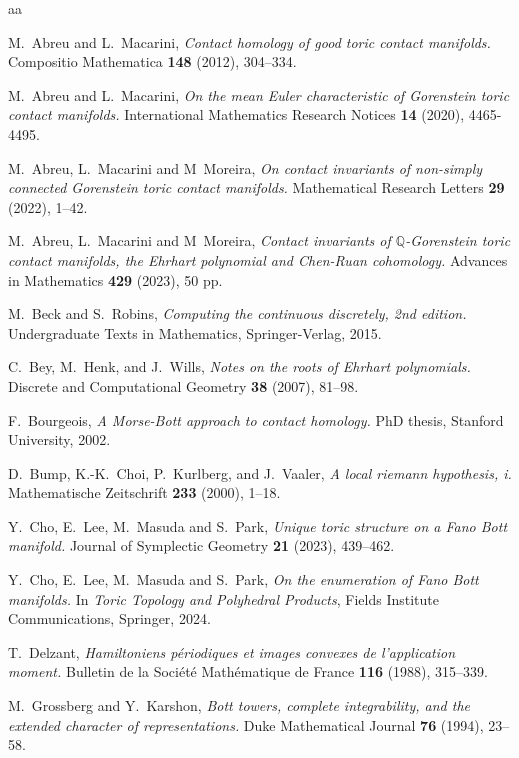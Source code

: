 \documentclass[a4paper,11pt,reqno]{amsart}
\newcommand{\Q}{\mathbb Q}
\begin{document}
\begin{thebibliography}{aa}

 M.~Abreu and L.~Macarini, {\em Contact homology of good toric contact manifolds.}
Compositio Mathematica {\bf 148} (2012), 304--334.

 M.~Abreu and L.~Macarini, {\em On the mean Euler characteristic of Gorenstein toric contact manifolds.}
International Mathematics Research Notices {\bf 14} (2020), 4465-4495.

 M.~Abreu, L.~Macarini and M~Moreira, {\em On contact invariants of non-simply connected Gorenstein 
toric contact manifolds.} Mathematical Research Letters {\bf 29} (2022), 1--42.

 M.~Abreu, L.~Macarini and M~Moreira, {\em Contact invariants of $\Q$-Gorenstein toric contact manifolds, the Ehrhart polynomial and Chen-Ruan cohomology.} Advances in Mathematics {\bf 429} (2023), 50 pp.

 M.~Beck and S.~Robins, {\em Computing the continuous discretely, 2nd edition.} Undergraduate Texts in Mathematics, 
Springer-Verlag, 2015.

 C.~Bey, M.~Henk, and J.~Wills, {\em Notes on the roots of Ehrhart polynomials.} 
Discrete and Computational Geometry {\bf 38} (2007), 81--98.

 F.~Bourgeois,  {\em A Morse-Bott approach to contact homology.} PhD thesis, Stanford University, 2002.

 D.~Bump, K.-K.~Choi, P.~Kurlberg, and J.~Vaaler, {\em A local riemann hypothesis, i.} 
Mathematische Zeitschrift {\bf 233} (2000), 1--18.

 Y.~Cho, E.~Lee, M.~Masuda and S.~Park, {\em Unique toric structure on a Fano Bott manifold.}
Journal of Symplectic Geometry {\bf 21} (2023), 439--462.

 Y.~Cho, E.~Lee, M.~Masuda and S.~Park, {\em On the enumeration of Fano Bott manifolds.}
In {\em Toric Topology and Polyhedral Products}, Fields Institute Communications, Springer, 2024.

 T.~Delzant, {\em Hamiltoniens p\'eriodiques et images convexes de l'application moment.} 
Bulletin de la Soci\'et\'e Math\'ematique de France {\bf 116} (1988), 315--339.

 M.~Grossberg and Y.~Karshon, {\em Bott towers, complete integrability, and the extended character 
of representations.} Duke Mathematical Journal {\bf 76} (1994), 23--58.


\end{thebibliography}
\end{document}
